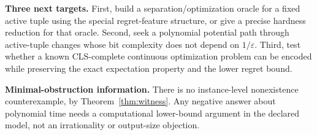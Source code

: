 \documentclass[11pt,a4paper]{article}
\theoremstyle{definition}\newtheorem{definition}[theorem]{Definition}
\theoremstyle{remark}\newtheorem{remark}[theorem]{Remark}
\newcommand{\1}{\mathbf 1}
\begin{document}
\textbf{Three next targets.} First, build a separation/optimization oracle for a fixed active tuple using the special regret-feature structure, or give a precise hardness reduction for that oracle. Second, seek a polynomial potential path through active-tuple changes whose bit complexity does not depend on $1/\varepsilon$. Third, test whether a known CLS-complete continuous optimization problem can be encoded while preserving the exact expectation property and the lower regret bound.

\textbf{Minimal-obstruction information.} There is no instance-level nonexistence counterexample, by Theorem~\ref{thm:witness}. Any negative answer about polynomial time needs a computational lower-bound argument in the declared model, not an irrationality or output-size objection.
\end{document}
